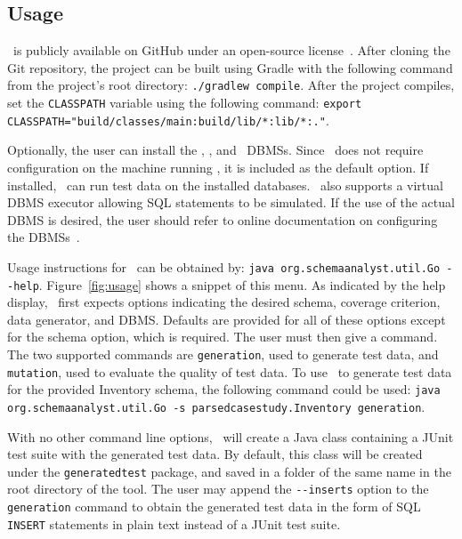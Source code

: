 \subsection{Usage}


\sa~is publicly available on GitHub under an open-source license~\cite{tool}. After cloning the Git
repository, the project can be built using Gradle with the following command from the project's root directory:
\lstinline{./gradlew compile}. After the project compiles, set the \lstinline{CLASSPATH} variable using the following
command: \lstinline{export CLASSPATH="build/classes/main:build/lib/*:lib/*:."}.

Optionally, the user can install the \postgres, \sqlite, and \hypersql~DBMSs. Since \sqlite~does not require
configuration on the machine running \sa, it is included as the default option. If installed, \sa~can run test data on
the installed databases. \sa~also supports a virtual DBMS executor allowing SQL statements to be simulated. If the use
of the actual DBMS is desired, the user should refer to online documentation on configuring the DBMSs~\cite{tool}.



Usage instructions for \sa~can be obtained by: \lstinline{java org.schemaanalyst.util.Go --help}.
Figure~\ref{fig:usage} shows a snippet of this menu.  As indicated by the help display, \sa~first
expects options indicating the desired schema, coverage criterion, data generator, and DBMS\@. Defaults are provided for
all of these options except for the schema option, which is required. The user must then give a command.  The two
supported commands are \lstinline{generation}, used to generate test data, and \lstinline{mutation}, used to evaluate
the quality of test data.  To use \sa~to generate test data for the provided Inventory schema, the
following command could be used: \lstinline{java org.schemaanalyst.util.Go -s parsedcasestudy.Inventory generation}.

With no other command line options, \sa~will create a Java class containing a JUnit test suite with
the generated test data. By default, this class will be created under the \texttt{generatedtest} package, and saved in a
folder of the same name in the root directory of the tool.  The user may append the \lstinline{--inserts} option to the
\lstinline{generation} command to obtain the generated test data in the form of SQL \texttt{INSERT} statements in plain
text instead of a JUnit test suite.

